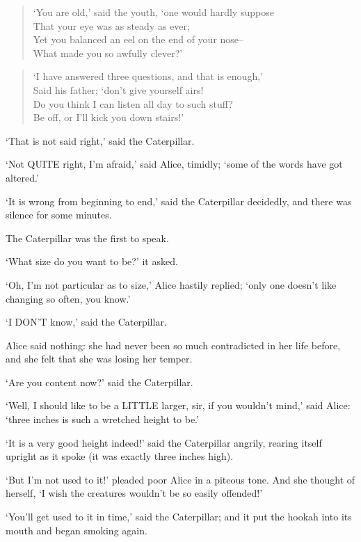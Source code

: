 \documentclass[12pt]{book}
\begin{document}
\begin{verse}
    `You are old,' said the youth, `one would hardly suppose\\
      That your eye was as steady as ever;\\
    Yet you balanced an eel on the end of your nose--\\
      What made you so awfully clever?'
\end{verse}
\begin{verse}
    `I have answered three questions, and that is enough,'\\
      Said his father; `don't give yourself airs!\\
    Do you think I can listen all day to such stuff?\\
      Be off, or I'll kick you down stairs!'
\end{verse}

  `That is not said right,' said the Caterpillar.

  `Not QUITE right, I'm afraid,' said Alice, timidly; `some of the
words have got altered.'

  `It is wrong from beginning to end,' said the Caterpillar
decidedly, and there was silence for some minutes.

  The Caterpillar was the first to speak.

  `What size do you want to be?' it asked.

  `Oh, I'm not particular as to size,' Alice hastily replied;
`only one doesn't like changing so often, you know.'

  `I DON'T know,' said the Caterpillar.

  Alice said nothing:  she had never been so much contradicted in
her life before, and she felt that she was losing her temper.

  `Are you content now?' said the Caterpillar.

  `Well, I should like to be a LITTLE larger, sir, if you
wouldn't mind,' said Alice:  `three inches is such a wretched
height to be.'

  `It is a very good height indeed!' said the Caterpillar
angrily, rearing itself upright as it spoke (it was exactly three
inches high).

  `But I'm not used to it!' pleaded poor Alice in a piteous tone.
And she thought of herself, `I wish the creatures wouldn't be so
easily offended!'

  `You'll get used to it in time,' said the Caterpillar; and it
put the hookah into its mouth and began smoking again.
\end{document}
